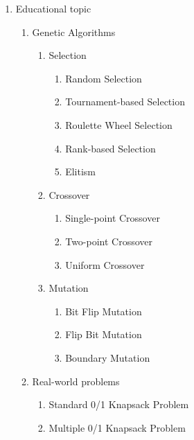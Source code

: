\documentclass[12pt,oneside,openright,a4paper]{cpe-english-project}
\begin{document}
\begin{enumerate}
\begin{enumerate}
\begin{enumerate}
		\end{enumerate}
	\end{enumerate}
	\item Educational topic
	\begin{enumerate}
		\item Genetic Algorithms
		\begin{enumerate}
			\item Selection
			\begin{enumerate}
				\item Random Selection
				\item Tournament-based Selection
				\item Roulette Wheel Selection
				\item Rank-based Selection
				\item Elitism
			\end{enumerate}
			\item Crossover
			\begin{enumerate}
				\item Single-point Crossover
				\item Two-point Crossover
				\item Uniform Crossover
			\end{enumerate}
			\item Mutation
			\begin{enumerate}
				\item Bit Flip Mutation
				\item Flip Bit Mutation
				\item Boundary Mutation
			\end{enumerate}
		\end{enumerate}
		\item Real-world problems
		\begin{enumerate}
			\item Standard 0/1 Knapsack Problem
			\item Multiple 0/1 Knapsack Problem
		\end{enumerate}
	\end{enumerate}
\end{enumerate}

\end{document}

